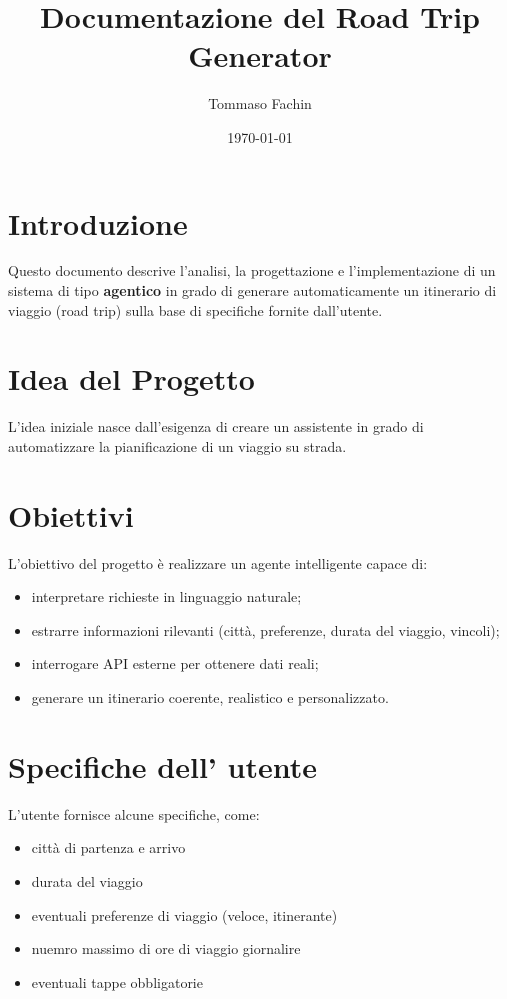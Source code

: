 \documentclass[12pt]{article}
\title{Documentazione del Road Trip Generator}
\author{Tommaso Fachin}
\date{\today}
\begin{document}
\maketitle
\tableofcontents
\newpage

\onehalfspacing

\section{Introduzione}
Questo documento descrive l'analisi, la progettazione e l'implementazione di un sistema di tipo \textbf{agentico} in grado di generare automaticamente un itinerario di viaggio (road trip) sulla base di specifiche fornite dall'utente.



\section{Idea del Progetto}
L'idea iniziale nasce dall'esigenza di creare un assistente in grado di automatizzare la pianificazione di un viaggio su strada.  

\section{Obiettivi}
L'obiettivo del progetto è realizzare un agente intelligente capace di:
\begin{itemize}
    \item interpretare richieste in linguaggio naturale;
    \item estrarre informazioni rilevanti (città, preferenze, durata del viaggio, vincoli);
    \item interrogare API esterne per ottenere dati reali;
    \item generare un itinerario coerente, realistico e personalizzato.
\end{itemize}

\section {Specifiche dell' utente}
L'utente fornisce alcune specifiche, come:
\begin{itemize}
    \item città di partenza e arrivo
    \item durata del viaggio
    \item eventuali preferenze di viaggio (veloce, itinerante)
    \item nuemro massimo di ore di viaggio giornalire
    \item eventuali tappe obbligatorie
\end{itemize}
\end{document}
